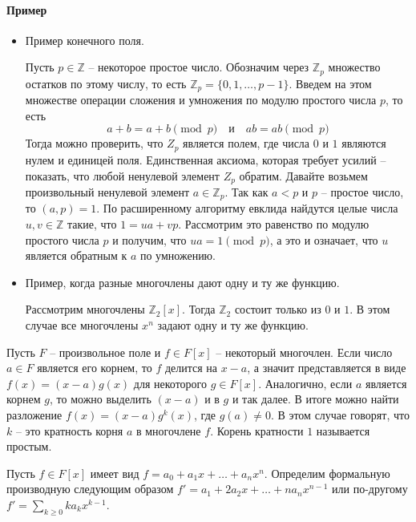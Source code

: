 \paragraph{Пример}
\begin{itemize}
\item Пример конечного поля.

Пусть $p\in \mathbb Z$ -- некоторое простое число. Обозначим через $\mathbb Z_p$ множество остатков по этому числу, то есть $\mathbb Z_p = \{0, 1, \ldots, p-1\}$. Введем на этом множестве операции сложения и умножения по модулю простого числа $p$, то есть
\[
a + b = a + b\pmod p\quad \text{и}\quad a b = ab \pmod p
\]
Тогда можно проверить, что $Z_p$ является полем, где числа $0$ и $1$ являются нулем и единицей поля. Единственная аксиома, которая требует усилий -- показать, что любой ненулевой элемент $Z_p$ обратим. Давайте возьмем произвольный ненулевой элемент $a\in \mathbb Z_p$. Так как $ a < p$ и $p$ -- простое число, то $(a, p) =1$. По расширенному алгоритму евклида найдутся целые числа $u, v\in\mathbb Z$ такие, что $1 = u a + vp$. Рассмотрим это равенство по модулю простого числа $p$ и получим, что
$u a = 1 \pmod p$, а это и означает, что $u$ является обратным к $a$ по умножению.

\item Пример, когда разные многочлены дают одну и ту же функцию.

Рассмотрим многочлены $\mathbb Z_2[x]$. Тогда $\mathbb Z_2$ состоит только из $0$ и $1$. В этом случае все многочлены $x^n$ задают одну и ту же функцию.
\end{itemize}

\begin{definition}
 Пусть $F$ -- произвольное поле и $f\in F[x]$ -- некоторый многочлен. Если число $a\in F$ является его корнем, то $f$ делится на $x - a$, а значит представляется в виде $f(x) = (x - a) g(x)$ для некоторого $g\in F[x]$. Аналогично, если $a$ является корнем $g$, то можно выделить $(x - a)$ и в $g$ и так далее. В итоге можно найти разложение $f(x) = (x - a) g^k(x)$, где $g(a) \neq 0$. В этом случае говорят, что $k$ -- это кратность корня $a$ в многочлене $f$. Корень кратности $1$ называется простым.
\end{definition}


\begin{definition}
Пусть $f\in F[x]$ имеет вид $f = a_0 + a_1 x + \ldots + a_n x^n$. Определим формальную производную следующим образом $f' = a_1 + 2a_2 x+\ldots + na_n x^{n-1}$ или по-другому $f'=\sum_{k\geqslant 0} k a_k x^{k-1}$.
\end{definition}

